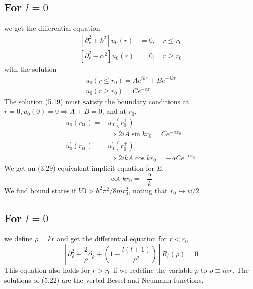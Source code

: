\subsection{For $l = 0$}
we get the differential equation
\begin{equation}
\begin{aligned}\left[\partial_{r}^{2}+k^{2}\right] u_{0}(r) &=0, \quad r \leq r_{0} \\\left[\partial_{r}^{2}-\alpha^{2}\right] u_{0}(r) &=0, \quad r \geq r_{0} \end{aligned}
\end{equation}
with the solution
\begin{equation}
\begin{array}{l}{u_{0}\left(r \leq r_{0}\right)=A e^{i k r}+B e^{-i k r}} \\ {u_{0}\left(r \geq r_{0}\right)=C e^{-\alpha r}}\end{array}
\end{equation}
The solution (5.19) must satisfy the boundary conditions at $r = 0, u_0 (0) = 0 \Rightarrow A + B = 0$, and at $r_0$,
\begin{equation}
\begin{aligned} u_{0}\left(r_{0}^{-}\right)=& u_{0}\left(r_{0}^{+}\right) \\ & \Rightarrow 2 i A \sin k r_{0}=C e^{-\alpha r_{0}} \\ u_{0}^{\prime}\left(r_{0}^{-}\right)=& u_{0}^{\prime}\left(r_{0}^{+}\right) \\ & \Rightarrow 2 i k A \cos k r_{0}=-\alpha C e^{-\alpha r_{0}} \end{aligned}
\end{equation}
We get an (3.29) equivalent implicit equation for $E$,
\begin{equation}
    \cot k r_{0}=-\frac{\alpha}{k}
    \end{equation}
We find bound states if $V0> \hbar^2\pi^2/8mr_0^2$, noting that $r_0 \longleftrightarrow w / 2$.

\subsection{For $l=0$}
we define $\rho = kr$ and get the differential equation for $r<r_0$
\begin{equation}
    \left[\partial_{\rho}^{2}+\frac{2}{\rho} \partial_{\rho}+\left(1-\frac{l(l+1)}{\rho^{2}}\right)\right] R_{l}(\rho)=0
    \end{equation}
This equation also holds for $r >r_0$ if we redefine the variable $\rho$ to $\rho\equiv i\alpha r$. The solutions of (5.22) are the verbal Bessel and Neumann functions,

